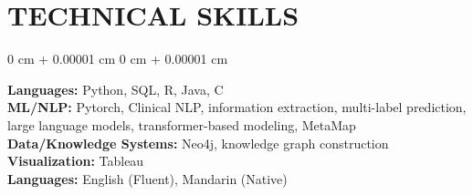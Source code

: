 \documentclass[10pt, letterpaper]{article}
\newenvironment{onecolentry}{
    \begin{adjustwidth}{
        0 cm + 0.00001 cm
    }{
        0 cm + 0.00001 cm
    }
}{
    \end{adjustwidth}
} %
\begin{document}
    \section{TECHNICAL SKILLS}

\begin{onecolentry}
\textbf{Languages:} Python, SQL, R, Java, C \\
\textbf{ML/NLP:} Pytorch, Clinical NLP, information extraction, multi-label prediction, large language models, transformer-based modeling, MetaMap \\
\textbf{Data/Knowledge Systems:} Neo4j, knowledge graph construction \\
\textbf{Visualization:} Tableau \\
\textbf{Languages:} English (Fluent), Mandarin (Native)
\end{onecolentry}

    
    

    
\end{document}
